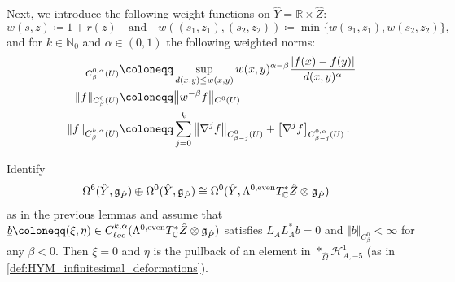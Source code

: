 \documentclass[11pt,a4paper]{scrartcl}
\newcommand{\VertC}[2]{\Vert_{C^{{#1}}{#2}}}
\newcommand{\VertWC}[3]{\Vert_{C^{{#1}}_{{#2}}{#3}}}
\newcommand{\VertWH}[3]{\Vert_{C^{{#1},\alpha}_{{#2}}{#3}}}
\newcommand{\WsH}[3]{]_{C^{{#1},\alpha}_{{#2}}{#3}}}
\numberwithin{equation}{section}
\theoremstyle{plain}
\theoremstyle{definition}
\theoremstyle{remark}
\begin{document}
Next, we introduce the following weight functions on $\hat{Y} = \mathbb{R} \times \hat{Z}$:  \[w(s,z) \coloneqq 1 + r(z) \quad \text{and} \quad w((s_1,z_1),(s_2,z_2))\coloneqq \min\{w(s_1,z_1),w(s_2,z_2)\},\] and for $k\in \mathbb{N}_0$ and $\alpha\in(0,1)$ the following weighted norms:
\begin{align*}
[f\WsH{0}{\beta}{(U)} &\coloneqq \sup_{d(x,y)\leq w(x,y)} w(x,y)^{\alpha-\beta} \frac{\vert f(x)-f(y) \vert}{d(x,y)^\alpha}  \\
\Vert f \VertWC{0}{\beta}{(U)} & \coloneqq \big\Vert w^{-\beta} f \big{\VertC{0}{(U)}} \\
\Vert f \VertWH{k}{\beta}{(U)} & \coloneqq \sum_{j=0}^k \left\Vert \nabla^j f \right\VertWC{0}{\beta-j}{(U)} + \left[\nabla^j f\right\WsH{0}{\beta-j}{(U)}.
\end{align*} 

\begin{proposition}\label{prop:instanton_deformations_come_from_HYM-deformations}
Identify \begin{align*}
\Omega^6(\hat{Y},\mathfrak{g}_{\hat{P}}) \oplus \Omega^0(\hat{Y},\mathfrak{g}_{\hat{P}}) &\cong \Omega^0(\hat{Y},\Lambda^{0,\textup{even}}T^*_\mathbb{C}\hat{Z} \otimes \mathfrak{g}_{\hat{P}})
\end{align*}
as in the previous lemmas and assume that $\underline{b}\coloneqq (\xi,\eta) \in C^{k,\alpha}_{\ell oc}(\Lambda^{0,\textup{even}}T^*_\mathbb{C}\hat{Z} \otimes \mathfrak{g}_{\hat{P}})$ satisfies $L_AL_A^* \underline{b}=0$ and $\Vert \underline{b}\VertWC{0}{\beta}{} < \infty$ for any $\beta <0$. Then $\xi=0$ and $\eta$ is the pullback of an element in $*_{\hat{\Omega}}\mathcal{H}^1_{A,-5}$ (as in \autoref{def:HYM_infinitesimal_deformations}).
\end{proposition}
\end{document}
